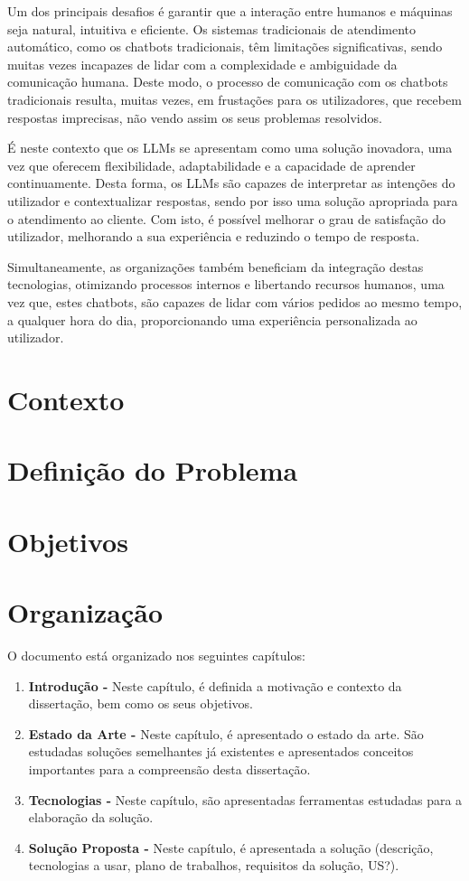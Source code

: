 Um dos principais desafios é garantir que a interação entre humanos e máquinas seja natural, intuitiva e eficiente. Os sistemas tradicionais de atendimento automático, como os chatbots tradicionais, têm limitações significativas, 
sendo muitas vezes incapazes de lidar com a complexidade e ambiguidade da comunicação humana. 
Deste modo, o processo de comunicação com os chatbots tradicionais resulta, muitas vezes, em frustações para os utilizadores, que recebem respostas imprecisas, não vendo assim os seus problemas resolvidos.

É neste contexto que os LLMs se apresentam como uma solução inovadora, uma vez que oferecem flexibilidade, adaptabilidade e a capacidade de aprender continuamente. 
Desta forma, os LLMs são capazes de interpretar as intenções  do utilizador e contextualizar respostas, sendo por isso uma solução apropriada para o atendimento ao cliente.
Com isto, é possível melhorar o grau de satisfação do utilizador, melhorando a sua experiência e reduzindo o tempo de resposta. 

Simultaneamente, as organizações também beneficiam da integração destas tecnologias, otimizando processos internos e libertando recursos humanos, uma vez que, estes chatbots, são capazes de lidar com vários pedidos ao mesmo tempo, a qualquer hora do dia,
proporcionando uma experiência personalizada ao utilizador.

\section{Contexto}
\label{sec:context}

\section{Definição do Problema}
\label{sec:problem}

\section{Objetivos}
\label{sec:objetivos}

\section{Organização}
\label{sec:organization}

O documento está organizado nos seguintes capítulos:
\begin{enumerate}
  \item \textbf{Introdução - } Neste capítulo, é definida a motivação e contexto da dissertação, bem como os seus objetivos.
  \item \textbf{Estado da Arte - } Neste capítulo, é apresentado o estado da arte. São estudadas soluções semelhantes já existentes e apresentados conceitos importantes para a compreensão desta dissertação.
  \item \textbf{Tecnologias - } Neste capítulo, são apresentadas ferramentas estudadas para a elaboração da solução.   
  \item \textbf{Solução Proposta - } Neste capítulo, é apresentada a solução (descrição, tecnologias a usar, plano de trabalhos, requisitos da solução, US?).
\end{enumerate}

